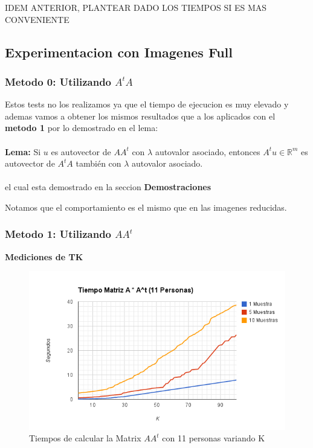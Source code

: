 IDEM ANTERIOR, PLANTEAR DADO LOS TIEMPOS SI ES MAS CONVENIENTE

\subsection{Experimentacion con Imagenes Full}

\subsubsection{Metodo 0: Utilizando $A^tA$}

Estos tests no los realizamos ya que el tiempo de ejecucion es muy elevado y ademas vamos  a obtener los mismos resultados que a los aplicados con el \textbf{metodo 1} por lo demostrado en el lema:
\\
\\
\textbf{Lema:} Si $u$ es autovector de $A A^t$ con $\lambda$ autovalor asociado, entonces $A^t u \in
\mathbb{R}^m$ es autovector de $A^t A$ también con $\lambda$ autovalor asociado.
\\
\\
 el cual esta demostrado en la seccion \textbf{Demostraciones}
 
Notamos que el comportamiento es el mismo que en las imagenes reducidas.


\subsubsection{Metodo 1: Utilizando $AA^t$}

\textbf{Mediciones de TK}

\begin{figure}[H]
\includegraphics[width=1\textwidth]{img/imagef1.png}
     \caption{Tiempos de calcular la Matrix $AA^t$ con 11 personas variando K}
\end{figure}


